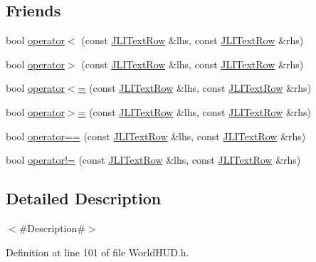 \subsection*{Friends}
\begin{DoxyCompactItemize}
\item 
bool \mbox{\hyperlink{structnjli_1_1_j_l_i_text_row_a8cebc5909fc78b73ff12cfcf8163fc42}{operator$<$}} (const \mbox{\hyperlink{structnjli_1_1_j_l_i_text_row}{J\+L\+I\+Text\+Row}} \&lhs, const \mbox{\hyperlink{structnjli_1_1_j_l_i_text_row}{J\+L\+I\+Text\+Row}} \&rhs)
\item 
bool \mbox{\hyperlink{structnjli_1_1_j_l_i_text_row_a7a98698f509414d766a1bca5fe3c804e}{operator$>$}} (const \mbox{\hyperlink{structnjli_1_1_j_l_i_text_row}{J\+L\+I\+Text\+Row}} \&lhs, const \mbox{\hyperlink{structnjli_1_1_j_l_i_text_row}{J\+L\+I\+Text\+Row}} \&rhs)
\item 
bool \mbox{\hyperlink{structnjli_1_1_j_l_i_text_row_abfc18ec33fd074ea140c6679cb6d104e}{operator$<$=}} (const \mbox{\hyperlink{structnjli_1_1_j_l_i_text_row}{J\+L\+I\+Text\+Row}} \&lhs, const \mbox{\hyperlink{structnjli_1_1_j_l_i_text_row}{J\+L\+I\+Text\+Row}} \&rhs)
\item 
bool \mbox{\hyperlink{structnjli_1_1_j_l_i_text_row_a93d67945dad8ea8ef959df9acefcc64e}{operator$>$=}} (const \mbox{\hyperlink{structnjli_1_1_j_l_i_text_row}{J\+L\+I\+Text\+Row}} \&lhs, const \mbox{\hyperlink{structnjli_1_1_j_l_i_text_row}{J\+L\+I\+Text\+Row}} \&rhs)
\item 
bool \mbox{\hyperlink{structnjli_1_1_j_l_i_text_row_ae1ea2e269caff412bc9b4df25af04c45}{operator==}} (const \mbox{\hyperlink{structnjli_1_1_j_l_i_text_row}{J\+L\+I\+Text\+Row}} \&lhs, const \mbox{\hyperlink{structnjli_1_1_j_l_i_text_row}{J\+L\+I\+Text\+Row}} \&rhs)
\item 
bool \mbox{\hyperlink{structnjli_1_1_j_l_i_text_row_a23fb4aef4a3336830ac13966d757cc33}{operator!=}} (const \mbox{\hyperlink{structnjli_1_1_j_l_i_text_row}{J\+L\+I\+Text\+Row}} \&lhs, const \mbox{\hyperlink{structnjli_1_1_j_l_i_text_row}{J\+L\+I\+Text\+Row}} \&rhs)
\end{DoxyCompactItemize}


\subsection{Detailed Description}
$<$\#\+Description\#$>$ 

Definition at line 101 of file World\+H\+U\+D.\+h.



